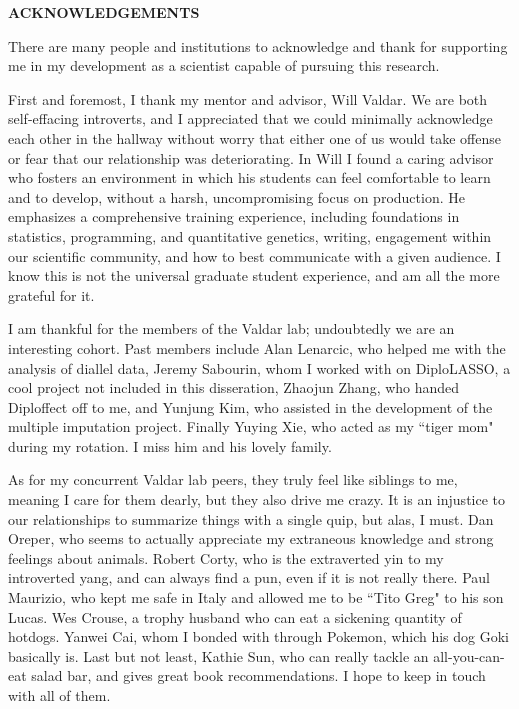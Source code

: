 
\begin{center}
\vspace*{52pt}
{\large \textbf{ACKNOWLEDGEMENTS}}
\end{center}

There are many people and institutions to acknowledge and thank for supporting me in my development as a scientist capable of pursuing this research. 

First and foremost, I thank my mentor and advisor, Will Valdar. We are both self-effacing introverts, and I appreciated that we could minimally acknowledge each other in the hallway without worry that either one of us would take offense or fear that our relationship was deteriorating. In Will I found a caring advisor who fosters an environment in which his students can feel comfortable to learn and to develop, without a harsh, uncompromising focus on production. He emphasizes a comprehensive training experience, including foundations in statistics, programming, and quantitative genetics, writing, engagement within our scientific community, and how to best communicate with a given audience. I know this is not the universal graduate student experience, and am all the more grateful for it.

I am thankful for the members of the Valdar lab; undoubtedly we are an interesting cohort. Past members include Alan Lenarcic, who helped me with the analysis of diallel data, Jeremy Sabourin, whom I worked with on DiploLASSO, a cool project not included in this disseration, Zhaojun Zhang, who handed Diploffect off to me, and Yunjung Kim, who assisted in the development of the multiple imputation project. Finally Yuying Xie, who acted as my ``tiger mom" during my rotation. I miss him and his lovely family. 

As for my concurrent Valdar lab peers, they truly feel like siblings to me, meaning I care for them dearly, but they also drive me crazy. It is an injustice to our relationships to summarize things with a single quip, but alas, I must. Dan Oreper, who seems to actually appreciate my extraneous knowledge and strong feelings about animals. Robert Corty, who is the extraverted yin to my introverted yang, and can always find a pun, even if it is not really there. Paul Maurizio, who kept me safe in Italy and allowed me to be ``Tito Greg" to his son Lucas. Wes Crouse, a trophy husband who can eat a sickening quantity of hotdogs. Yanwei Cai, whom I bonded with through Pokemon, which his dog Goki basically is. Last but not least, Kathie Sun, who can really tackle an all-you-can-eat salad bar, and gives great book recommendations. I hope to keep in touch with all of them.

